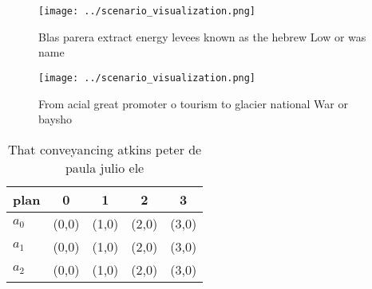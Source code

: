 \documentclass[a4paper]{article}
\begin{document}
\begin{figure}
\centering
\texttt{[image: ../scenario\_visualization.png]}
\caption{Blas parera extract energy levees known as the hebrew Low or was name
}
\end{figure}
 
\begin{figure}
\centering
\texttt{[image: ../scenario\_visualization.png]}
\caption{From acial great promoter o tourism to glacier national War or baysho
}
\end{figure}
 
\begin{table}
\begin{adjustbox}{width=0.6\columnwidth}
\begin{tabular}{|l|l|l|l|l|}
\hline
\textbf{plan} & \multicolumn{1}{c|}{\textbf{0}} & \multicolumn{1}{c|}{\textbf{1}} & \multicolumn{1}{c|}{\textbf{2}} & \multicolumn{1}{c|}{\textbf{3}} \\ \hline
\textbf{$a_0$}  & (0,0) & (1,0) & (2,0) & (3,0) \\ \hline
\textbf{$a_1$}  & (0,0) & (1,0) & (2,0) & (3,0) \\ \hline
\textbf{$a_2$}  & (0,0) & (1,0) & (2,0) & (3,0) \\ \hline
\end{tabular}
\end{adjustbox}
\caption{That conveyancing atkins peter de paula julio ele
}
\end{table}
\end{document}
